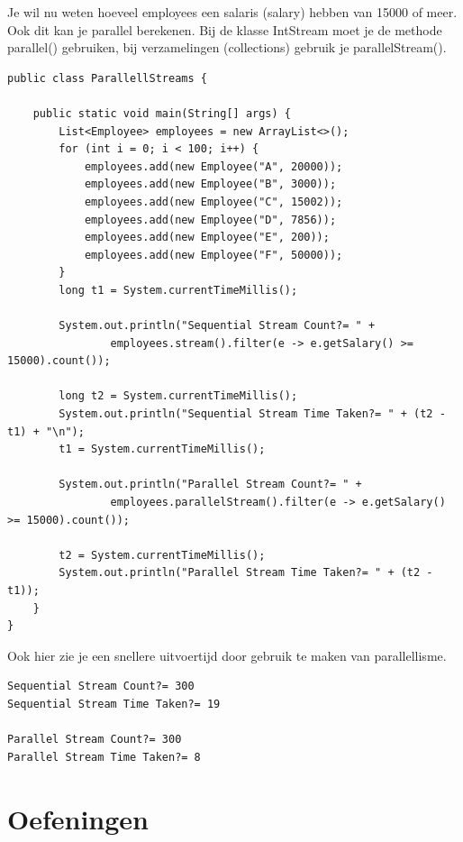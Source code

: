 Je wil nu weten hoeveel employees een salaris (salary) hebben van 15000 of meer. Ook dit kan je parallel berekenen. Bij de klasse IntStream moet je de methode parallel() gebruiken, bij verzamelingen (collections) gebruik je parallelStream().

\begin{lstlisting}
public class ParallellStreams {

	public static void main(String[] args) {
		List<Employee> employees = new ArrayList<>();
		for (int i = 0; i < 100; i++) {
			employees.add(new Employee("A", 20000));
			employees.add(new Employee("B", 3000));
			employees.add(new Employee("C", 15002));
			employees.add(new Employee("D", 7856));
			employees.add(new Employee("E", 200));
			employees.add(new Employee("F", 50000));
		}
		long t1 = System.currentTimeMillis();

		System.out.println("Sequential Stream Count?= " +
				employees.stream().filter(e -> e.getSalary() >= 15000).count());

		long t2 = System.currentTimeMillis();
		System.out.println("Sequential Stream Time Taken?= " + (t2 - t1) + "\n");
		t1 = System.currentTimeMillis();

		System.out.println("Parallel Stream Count?= " +
				employees.parallelStream().filter(e -> e.getSalary() >= 15000).count());

		t2 = System.currentTimeMillis();
		System.out.println("Parallel Stream Time Taken?= " + (t2 - t1));
	}
}
\end{lstlisting}

Ook hier zie je een snellere uitvoertijd door gebruik te maken van parallellisme.

\begin{verbatim}
Sequential Stream Count?= 300
Sequential Stream Time Taken?= 19

Parallel Stream Count?= 300
Parallel Stream Time Taken?= 8
\end{verbatim}

\section{Oefeningen}


